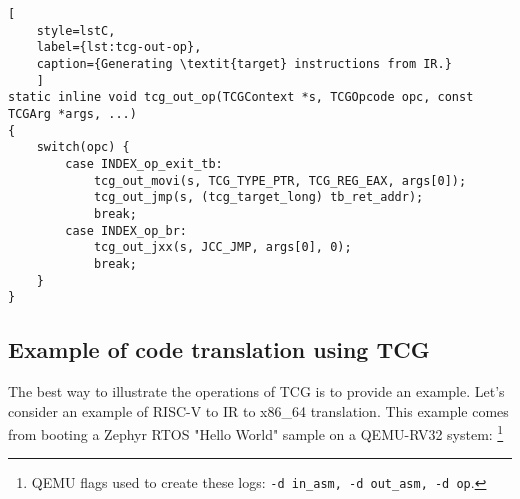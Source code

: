 \begin{lstlisting}[
    style=lstC,
    label={lst:tcg-out-op},
    caption={Generating \textit{target} instructions from IR.}
    ]
static inline void tcg_out_op(TCGContext *s, TCGOpcode opc, const TCGArg *args, ...)
{
    switch(opc) {
        case INDEX_op_exit_tb:
            tcg_out_movi(s, TCG_TYPE_PTR, TCG_REG_EAX, args[0]);
            tcg_out_jmp(s, (tcg_target_long) tb_ret_addr);
            break;
        case INDEX_op_br:
            tcg_out_jxx(s, JCC_JMP, args[0], 0);
            break;
    }
}
\end{lstlisting}

\pagebreak
\subsection{Example of code translation using TCG}

The best way to illustrate the operations of TCG is to provide an example. Let's consider an example of RISC-V to IR to
x86\_64 translation. This example comes from booting a Zephyr RTOS "Hello World" sample on a QEMU-RV32 system:
\footnote{QEMU flags used to create these logs: \texttt{-d in\_asm, -d out\_asm, -d op}.}

